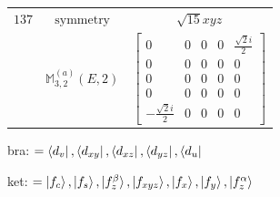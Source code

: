 \documentclass[fleqn,8pt,landscape]{jsarticle}
\begin{document}
\begin{longtable}{ccc}
$ 137 $ & $ \text{symmetry} $ & $ \sqrt{15} x y z $ \\
$  $ & $ \mathbb{M}_{3,2}^{(a)}(E,2) $ & $ \begin{bmatrix} 0 & 0 & 0 & 0 & \frac{\sqrt{2} i}{2} \\ 0 & 0 & 0 & 0 & 0 \\ 0 & 0 & 0 & 0 & 0 \\ 0 & 0 & 0 & 0 & 0 \\ - \frac{\sqrt{2} i}{2} & 0 & 0 & 0 & 0 \end{bmatrix} $ \\ \hline
\end{longtable}
bra: $=\bra{d_{v}}, \bra{d_{xy}}, \bra{d_{xz}}, \bra{d_{yz}}, \bra{d_{u}}$

\noindent
ket: $=\ket{f_{c}}, \ket{f_{s}}, \ket{f_{z}^{\beta}}, \ket{f_{xyz}}, \ket{f_{x}}, \ket{f_{y}}, \ket{f_{z}^{\alpha}}$
\renewcommand{\arraystretch}{1.6}
\end{document}
